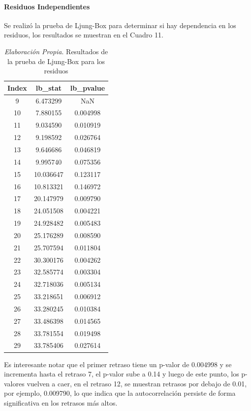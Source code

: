 \documentclass[12pt,letterpaper]{article}   %
\begin{document}
\paragraph{Residuos Independientes}
Se realizó la prueba de Ljung-Box para determinar si hay dependencia en los residuos, los resultados se muestran en el Cuadro 11.
\begin{table}[ht]
\footnotesize
\centering
\begin{tabular}{ccc}
\hline
\textbf{Index} & \textbf{lb\_stat} & \textbf{lb\_pvalue} \\
\hline
9 & 6.473299 & NaN \\
10 & 7.880155 & 0.004998 \\
11 & 9.034590 & 0.010919 \\
12 & 9.198592 & 0.026764 \\
13 & 9.646686 & 0.046819 \\
14 & 9.995740 & 0.075356 \\
15 & 10.036647 & 0.123117 \\
16 & 10.813321 & 0.146972 \\
17 & 20.147979 & 0.009790 \\
18 & 24.051508 & 0.004221 \\
19 & 24.928482 & 0.005483 \\
20 & 25.176289 & 0.008590 \\
21 & 25.707594 & 0.011804 \\
22 & 30.300176 & 0.004262 \\
23 & 32.585774 & 0.003304 \\
24 & 32.718036 & 0.005134 \\
25 & 33.218651 & 0.006912 \\
26 & 33.280245 & 0.010384 \\
27 & 33.486398 & 0.014565 \\
28 & 33.781554 & 0.019498 \\
29 & 33.785406 & 0.027614 \\
\hline
\end{tabular}
\caption{\textit{Elaboración Propia}. Resultados de la prueba de Ljung-Box para los residuos}
\end{table}

Es interesante notar que el primer retraso tiene un p-valor de 0.004998 y se incrementa hasta el retraso 7, el p-valor sube a 0.14 y luego de este punto, los p-valores vuelven a caer, en el retraso 12, se muestran retrasos por debajo de 0.01, por ejemplo, 0.009790, lo que indica que la autocorrelación persiste de forma significativa en los retrasos más altos. 
\end{document}
